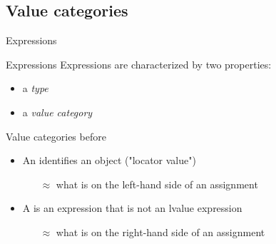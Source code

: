 %
%


\subsection{Value categories}

\begin{frame}{Expressions}{}
  \begin{block}{Expressions}
    Expressions are characterized by two properties:
    \begin{itemize}
    \item
      a \emph{type}
    \item
      a \emph{value category}
    \end{itemize}
  \end{block}

  \begin{block}{Value categories before }
    \begin{itemize}
    \item
      An  identifies an object ("locator value")
      \begin{itemize}
      \item[$\approx$]
        what is on the left-hand side  of an assignment
      \end{itemize}
    \item
      A  is an expression that is not an lvalue expression
      \begin{itemize}
      \item[$\approx$]
        what is on the right-hand side of an assignment
      \end{itemize}
    \end{itemize}
  \end{block}
\end{frame}

